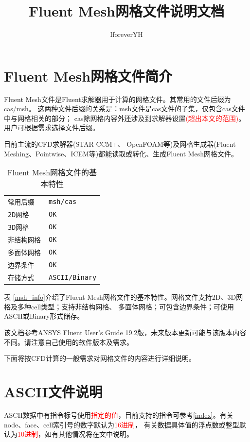 \documentclass[lang=cn,11pt,a4paper]{elegantpaper} %
\title{Fluent Mesh网格文件说明文档}
\author{IforeverYH}
\date{\zhtoday}
\begin{document}
\maketitle

\section{Fluent Mesh网格文件简介}

Fluent Mesh文件是Fluent求解器用于计算的网格文件。其常用的文件后缀为cas/msh。
这两种文件后缀的关系是：msh文件是cas文件的子集，仅包含cas文件中与网格相关的部分；
cas除网格内容外还涉及到求解器设置\textcolor{red}{(超出本文的范围)}。用户可根据需求选择文件后缀。

目前主流的CFD求解器(STAR CCM+、 OpenFOAM等)及网格生成器(Fluent Meshing、Pointwise、ICEM等)都能读取或转化、生成Fluent Mesh网格文件。

\label{msh_info}
\begin{table}[!htb]
  \centering
  \caption{Fluent Mesh网格文件的基本特性}
  \begin{tabular}{*{2}{l}}
   \hline
   \texttt{常用后缀}         & \texttt{msh/cas} \\
   \texttt{2D网格}           & \texttt{OK} \\
   \texttt{3D网格}           & \texttt{OK} \\
   \texttt{非结构网格}       & \texttt{OK} \\
   \texttt{多面体网格}       & \texttt{OK} \\
   \texttt{边界条件}         & \texttt{OK} \\
   \texttt{存储方式}         & \texttt{ASCII/Binary} \\
   \hline
  \end{tabular}
\end{table}

表 \ref{msh_info}介绍了Fluent Mesh网格文件的基本特性。网格文件支持2D、3D网格及多种cell类型；支持非结构网格、
多面体网格；可包含边界条件；可使用ASCII或Binary形式储存。

该文档参考ANSYS Fluent User's Guide 19.2版，未来版本更新可能与该版本内容不同。请注意自己使用的软件版本及需求。

下面将按CFD计算的一般需求对网格文件的内容进行详细说明。


\section{ASCII文件说明}

ASCII数据中有指令标号使用\textcolor{red}{指定的值}，目前支持的指令可参考\ref{index}。有关node、face、cell索引号的数字默认为\textcolor{red}{16进制}，
有关数据具体值的浮点数或整型默认为\textcolor{red}{10进制}，如有其他情况将在文中说明。
\end{document}

